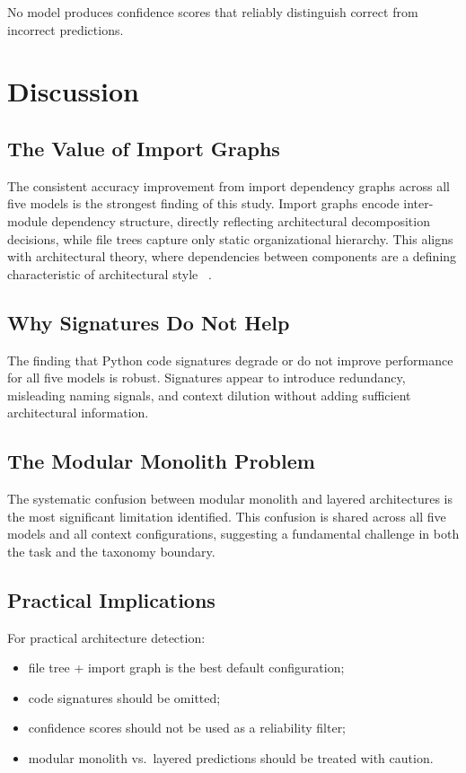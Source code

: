 \documentclass[runningheads]{llncs}
\begin{document}
No model produces confidence scores that reliably distinguish correct from incorrect predictions.

\section{Discussion}
\label{sec:discussion}

\subsection{The Value of Import Graphs}

The consistent accuracy improvement from import dependency graphs across all five models is the strongest finding of this study. Import graphs encode inter-module dependency structure, directly reflecting architectural decomposition decisions, while file trees capture only static organizational hierarchy. This aligns with architectural theory, where dependencies between components are a defining characteristic of architectural style~\cite{perry1992foundations} \cite{garlan1993introduction} \cite{bass2021software}.

\subsection{Why Signatures Do Not Help}

The finding that Python code signatures degrade or do not improve performance for all five models is robust. Signatures appear to introduce redundancy, misleading naming signals, and context dilution without adding sufficient architectural information.

\subsection{The Modular Monolith Problem}

The systematic confusion between modular monolith and layered architectures is the most significant limitation identified. This confusion is shared across all five models and all context configurations, suggesting a fundamental challenge in both the task and the taxonomy boundary.

\subsection{Practical Implications}

For practical architecture detection:
\begin{itemize}[nosep]
    \item file tree + import graph is the best default configuration;
    \item code signatures should be omitted;
    \item confidence scores should not be used as a reliability filter;
    \item modular monolith vs.\ layered predictions should be treated with caution.
\end{itemize}
\end{document}

